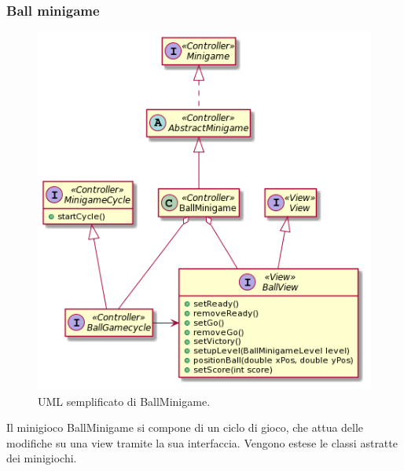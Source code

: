 \documentclass[a4paper,12pt]{report}
\begin{document}
    \subsubsection{Ball minigame}
    \begin{figure}[h]
    \centering{}
    \includegraphics[width=\textwidth]{images/freddi/BallMinigame.png}
    \caption{UML semplificato di BallMinigame.}
    \end{figure}

    Il minigioco BallMinigame si compone di un ciclo di gioco, che attua delle modifiche su una view tramite la sua interfaccia.
    Vengono estese le classi astratte dei minigiochi.
\end{document}
